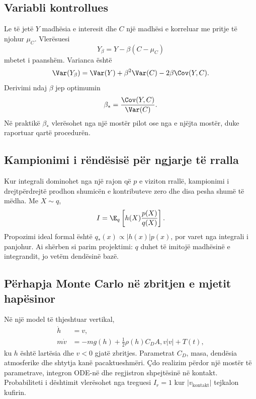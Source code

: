 \subsection{Variabli kontrollues}
Le të jetë $Y$ madhësia e interesit dhe $C$ një madhësi e korreluar me pritje të njohur $\mu_C$. Vlerësuesi
\begin{equation}
 Y_\beta=Y-\beta(C-\mu_C)
\end{equation}
mbetet i paanshëm. Varianca është
\begin{equation}
 \Var(Y_\beta)=\Var(Y)+\beta^2\Var(C)-2\beta\Cov(Y,C).
\end{equation}
Derivimi ndaj $\beta$ jep optimumin
\begin{equation}
 \beta_*=\frac{\Cov(Y,C)}{\Var(C)}.
\end{equation}
Në praktikë $\beta_*$ vlerësohet nga një mostër pilot ose nga e njëjta mostër, duke raportuar qartë procedurën.

\subsection{Kampionimi i rëndësisë për ngjarje të rralla}
Kur integrali dominohet nga një rajon që $p$ e viziton rrallë, kampionimi i drejtpërdrejtë prodhon shumicën e kontributeve zero dhe disa pesha shumë të mëdha. Me $X\sim q$,
\begin{equation}
 I=\E_q\left[h(X)\frac{p(X)}{q(X)}\right].
\end{equation}
Propozimi ideal formal është $q_*(x)\propto|h(x)|p(x)$, por varet nga integrali i panjohur. Ai shërben si parim projektimi: $q$ duhet të imitojë madhësinë e integrandit, jo vetëm dendësinë bazë.

\subsection{Përhapja Monte Carlo në zbritjen e mjetit hapësinor}
Në një model të thjeshtuar vertikal,
\begin{align}
 \dot h&=v,\\
 m\dot v&=-mg(h)+\tfrac12\rho(h)C_DA,v|v|+T(t),
\end{align}
ku $h$ është lartësia dhe $v<0$ gjatë zbritjes. Parametrat $C_D$, masa, dendësia atmosferike dhe shtytja kanë pacaktueshmëri. Çdo realizim përdor një mostër të parametrave, integron ODE-në dhe regjistron shpejtësinë në kontakt. Probabiliteti i dështimit vlerësohet nga treguesi $I_r=1$ kur $|v_{\mathrm{kontakt}}|$ tejkalon kufirin.

